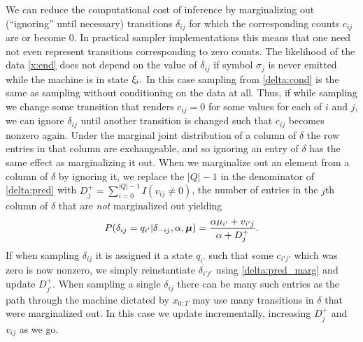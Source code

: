 We can reduce the computational cost of inference by marginalizing out (``ignoring'' until necessary) transitions $\delta_{ij}$ for which the corresponding counts $c_{ij}$ are or become 0.  In practical sampler implementations this means that one need not even represent transitions corresponding to zero counts.  The likelihood of the data \eqref{x:end} does not depend on the value of $\delta_{ij}$ if symbol $\sigma_j$ is never emitted while the machine is in state $\q_i.$   In this case sampling from \eqref{delta:cond} is the same as sampling without conditioning on the data at all.  Thus, if while sampling we change some transition that renders $c_{ij}=0$ for some values for each of $i$ and $j$, we can ignore $\delta_{ij}$ until another transition is changed such that $c_{ij}$ becomes nonzero again.  Under the marginal joint distribution of a column of $\delta$ the row entries in that column are exchangeable, and so ignoring an entry of $\delta$ has the same effect as marginalizing it out.  
When we marginalize out an element from a column of $\delta$ by ignoring it, we replace the $|Q| - 1$ in the denominator of \eqref{delta:pred} with $D^+_j = \sum_{i=0}^{|Q|-1}I(v_{ij}\neq0)$, the number of entries in the $j$th column of $\delta$ that are {\em not} marginalized out yielding
\begin{equation}
P(\delta_{ij} = q_{i'}|\delta_{-ij},\alpha,\bmu) = \frac{\alpha\mu_{i'} + v_{i'j}}{\alpha + D^+_j }. \label{delta:pred_marg}
\end{equation}
If when sampling $\delta_{ij}$ it is assigned it a state $q_{i'}$ such that some $c_{i'j'}$ which was zero is now nonzero, we simply reinstantiate $\delta_{i'j'}$ using \eqref{delta:pred_marg} and update $ D^+_{j'}$.  When sampling a single $\delta_{ij}$ there can be many such entries as the path through the machine dictated by $x_{0:T}$ may use many transitions in $\delta$ that were marginalized out.  In this case we update incrementally, increasing $D^+_j$ and $v_{ij}$ as we go.




